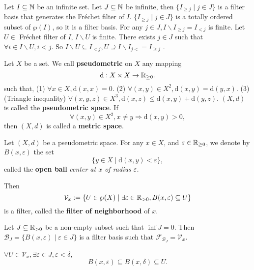 \begin{exampleenv}
    Let $I\subseteq \mathbb{N}$ be an infinite set. Let $J\subseteq \mathbb{N}$ be infinite, then $\{I_{\ge j}\mid j\in J \}$ is a filter basis that generates the Fréchet filter of $I$. $\{I_{\ge j}\mid j\in J\}$ is a totally ordered subset of $\wp(I)$, so it is a filter basis. For any $j\in J, I\backslash I_{\ge j}=I_{<j}$ is finite. Let $U\in $ Fréchet filter of $I$, $I\backslash U$ is finite. There exists $j\in J$ such that $\forall i\in I\backslash U,i<j$. So $I\backslash U\subseteq I_{<j}, U\supseteq I\backslash I_{j<}=I_{\ge j}$ .
\end{exampleenv}
\begin{exampleenv}
    Let $X$ be a set. We call \textbf{pseudometric} on $X$ any mapping
    $$\mathrm{d}: X\times X\to \mathbb{R}_{\ge 0}.$$ 
    such that,
    \newline
    (1) $\forall x\in X, \mathrm{d}(x,x)=0.$
    \newline
    (2) $\forall (x,y)\in X^2, \mathrm{d}(x,y)=\mathrm{d}(y,x)$.
    \newline
    (3) (Triangle inequality) $\forall (x,y,z)\in X^3, \mathrm{d}(x,z)\le \mathrm{d}(x,y)+\mathrm{d}(y,z).$
    \newline
    $(X,d)$ is called the \textbf{pseudometric space}. If $$\forall (x,y)\in X^2,x\not=y\Rightarrow \mathrm{d}(x,y)>0,$$ then $(X,d)$ is called a \textbf{metric space}.

    Let $(X,d)$ be a pseudometric space. For any $x\in X$, and $\varepsilon\in \mathbb{R}_{\ge 0}$, we denote by $B(x,\varepsilon)$ the set 
    $$\{y\in X\mid \mathrm{d}(x,y)<\varepsilon\},$$
    called the \textbf{open ball} \textit{center at $x$ of radius $\varepsilon$.} 
    
    Then  
    $$\mathcal{V}_x:=\{U\in \wp(X)\mid \exists \varepsilon\in \mathbb{R}_{>0}, B(x,\varepsilon)\subseteq U\}$$
    is a filter, called the \textbf{filter of neighborhood} of $x$.
\end{exampleenv}
\begin{propositionenv}
    Let $J\subseteq \mathbb{R}_{>0}$ be a non-empty subset such that $\inf J=0$. Then $\mathcal{B}_J=\{B(x,\varepsilon)\mid \varepsilon\in J\}$ is a filter basis such that $\mathcal{F}_{\mathcal{B}_J}=\mathcal{V}_x$.
\end{propositionenv}
\begin{proofenv}
    $\forall U\in \mathcal{V}_x,\exists \varepsilon\in J,\varepsilon<\delta$,
    $$B(x,\varepsilon)\subseteq B(x,\delta)\subseteq U.$$
\end{proofenv}

